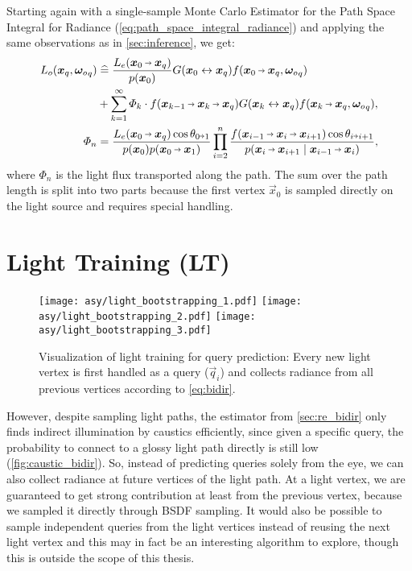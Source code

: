 Starting again with a single-sample Monte Carlo Estimator for the Path Space Integral for Radiance (\cref{eq:path_space_integral_radiance}) and applying the same observations as in \cref{sec:inference}, we get:
\begin{equation}
\label{eq:bidir}
\begin{aligned}
    L_o(\vec{x}_q, \wo_q)
    &\hateq \frac{L_e(\pdir{0}{q})}{p(\x_0)} \G{0}{q} f(\pdir{0}{q}, \wo_q) \\
    &+ \sum_{k=1}^{\infty} \Phi_k \cdot \f{k-1}{k}{q} \G{k}{q} f(\pdir{k}{q}, \wo_q), \\
    \Phi_n &= \frac{L_e(\pdir{0}{q}) \cos \theta_{0 \veryshortarrow 1}}{p(\x_0) p(\pdir{0}{1})} \prod_{i=2}^{n} \frac{f(\ptrip{i-1}{i}{i+1}) \cos \theta_{i \veryshortarrow i+1}}{p(\pdir{i}{i+1} \mid \pdir{i-1}{i})},
\end{aligned}
\end{equation}
where $\Phi_n$ is the light flux transported along the path.
The sum over the path length is split into two parts because the first vertex $\vec{x}_0$ is sampled directly on the light source and requires special handling.

\section{Light Training (LT)}
\label{sec:lt}
\begin{figure}[htb!]
    \centering
    \texttt{[image: asy/light\_bootstrapping\_1.pdf]}
    \texttt{[image: asy/light\_bootstrapping\_2.pdf]}
    \texttt{[image: asy/light\_bootstrapping\_3.pdf]}
    \caption{Visualization of light training for query prediction: Every new light vertex is first handled as a query ($\vec{q}_i$) and collects radiance from all previous vertices according to \cref{eq:bidir}.}
    \label{fig:light_bootstrap}
\end{figure}
However, despite sampling light paths, the estimator from \cref{sec:re_bidir} only finds indirect illumination by caustics efficiently, since given a specific query, the probability to connect to a glossy light path directly is still low (\cref{fig:caustic_bidir}).
So, instead of predicting queries solely from the eye, we can also collect radiance at future vertices of the light path.
At a light vertex, we are guaranteed to get strong contribution at least from the previous vertex, because we sampled it directly through BSDF sampling.
It would also be possible to sample independent queries from the light vertices instead of reusing the next light vertex and this may in fact be an interesting algorithm to explore, though this is outside the scope of this thesis.

